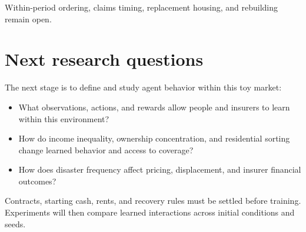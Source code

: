 \documentclass[11pt]{article}
\begin{document}
Within-period ordering, claims timing, replacement housing, and rebuilding remain open.

\section{Next research questions}
The next stage is to define and study agent behavior within this toy market:

\begin{itemize}
\item What observations, actions, and rewards allow people and insurers to learn within this environment?
\item How do income inequality, ownership concentration, and residential sorting change learned behavior and access to coverage?
\item How does disaster frequency affect pricing, displacement, and insurer financial outcomes?
\end{itemize}
Contracts, starting cash, rents, and recovery rules must be settled before training. Experiments will then compare learned interactions across initial conditions and seeds.
\end{document}
